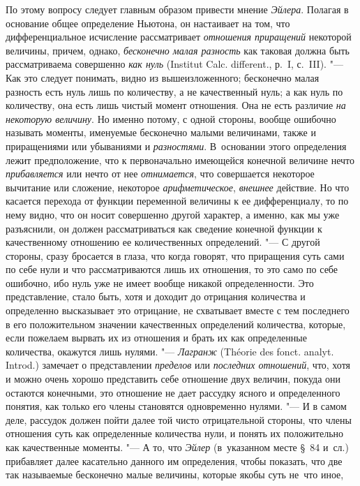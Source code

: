 По этому вопросу следует главным образом привести мнение {\em Эйлера}. Полагая
в основание общее определение Ньютона, он настаивает на том, что
дифференциальное исчисление рассматривает {\em отношения приращений} некоторой
величины, причем, однако, {\em бесконечно малая разность} как таковая должна
быть рассматриваема совершенно {\em как нуль} (Ins\-ti\-tut Calc.
dif\-fe\-rent., р.~I, с.~III). "--- Как это следует понимать, видно из
вышеизложенного; бесконечно малая разность есть нуль лишь по количеству, а не
качественный нуль; а как нуль по количеству, она есть лишь чистый момент
отношения. Она не есть различие {\em на некоторую величину}. Но именно потому,
с одной стороны, вообще ошибочно называть моменты, именуемые бесконечно малыми
величинами, также и приращениями или убываниями и {\em разностями}. В~основании
этого определения лежит предположение, что к первоначально имеющейся конечной
величине нечто {\em прибавляется} или нечто от нее {\em отнимается}, что
совершается некоторое вычитание или сложение, некоторое {\em арифметическое},
{\em внешнее} действие. Но что касается перехода от функции переменной величины
к ее дифференциалу, то по нему видно, что он носит совершенно другой характер,
а именно, как мы уже разъяснили, он должен рассматриваться как сведение
конечной функции к качественному отношению ее количественных определений. "---
С другой стороны, сразу бросается в глаза, что когда говорят, что приращения
суть сами по себе нули и что рассматриваются лишь их отношения, то это само по
себе ошибочно, ибо нуль уже не имеет вообще никакой определенности. Это
представление, стало быть, хотя и доходит до отрицания количества и определенно
высказывает это отрицание, не схватывает вместе с тем последнего в его
положительном значении качественных определений количества, которые, если
пожелаем вырвать их из отношения и брать их как определенные количества,
окажутся лишь нулями. "--- {\em Лагранж} (Théorie des fonct. analyt. Introd.)
замечает о представлении {\em пределов} или {\em последних отношений}, что,
хотя и можно очень хорошо представить себе отношение двух величин, покуда они
остаются конечными, это отношение не дает рассудку ясного и определенного
понятия, как только его члены становятся одновременно нулями. "--- И в самом
деле, рассудок должен пойти далее той чисто отрицательной стороны, что члены
отношения суть как определенные количества нули, и понять их положительно как
качественные моменты. "--- А то, что {\em Эйлер} (в~указанном месте \S~84
и~сл.) прибавляет далее касательно данного им определения, чтобы показать, что
две так называемые бесконечно малые величины, которые якобы суть не~что иное,
